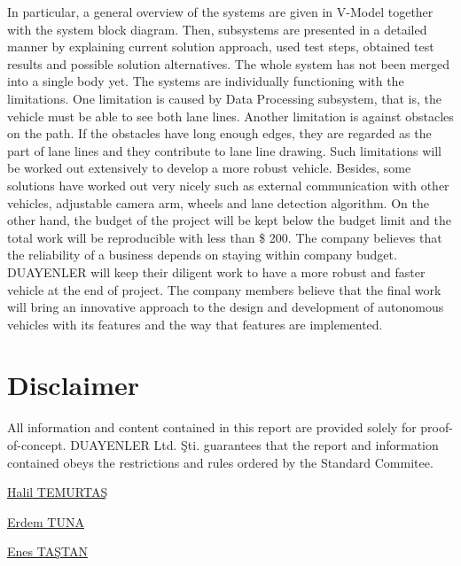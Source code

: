 \documentclass[a4paper,12pt]{article}
\begin{document}
	In particular, a general overview of the systems are given in V-Model together with the system block diagram. Then, subsystems are presented in a detailed manner by explaining current solution approach, used test steps, obtained test results and possible solution alternatives. The whole system has not been merged into a single body yet. The systems are individually functioning with the limitations. One limitation is caused by Data Processing subsystem, that is, the vehicle must be able to see both lane lines. Another limitation is against obstacles on the path. If the obstacles have long enough edges, they are regarded as the part of lane lines and they contribute to lane line drawing. Such limitations will be worked out extensively to develop a more robust vehicle. Besides, some solutions have worked out very nicely such as external communication with other vehicles, adjustable camera arm, wheels and lane detection algorithm. On the other hand, the budget of the project will be kept below the budget limit and the total work will be reproducible with less than \$ 200. The company believes that the reliability of a business depends on staying within company budget. \\
	
	DUAYENLER will keep their diligent work to have a more robust and faster vehicle at the end of project. The company members believe that the final work will bring an innovative approach to the design and development of autonomous vehicles with its features and the way that features are implemented.
	\newpage
		\section{Disclaimer}
		\vspace{1cm}
		
		\textsf{ All information and content contained in this report are provided solely for proof-of-concept. DUAYENLER Ltd. Şti. guarantees that the report and information contained obeys the restrictions and rules ordered by the Standard Commitee.}
		
		\vspace{1cm}
		
		
		\begin{minipage}[b]{0.33\linewidth}
			\centering
			\underline{Halil TEMURTAŞ}
		\end{minipage}%
		\begin{minipage}[b]{0.33\linewidth}
			\centering
			\underline{Erdem TUNA}
		\end{minipage}%
		\begin{minipage}[b]{0.33\linewidth}
			\centering
			\underline{Enes TAŞTAN}
		\end{minipage} \\[2.5cm]
		
\end{document}
